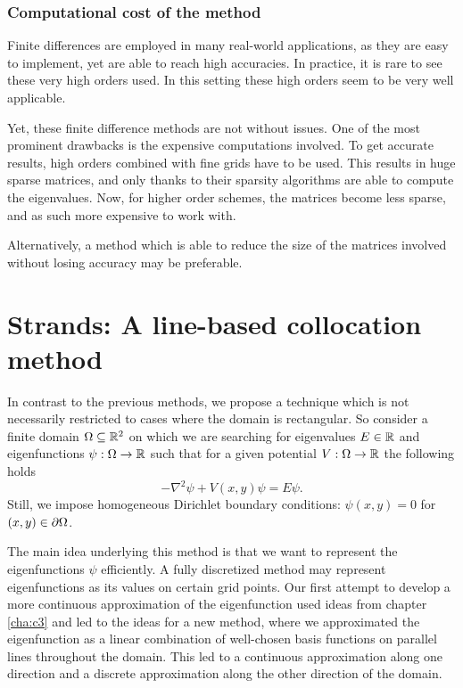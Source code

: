 

\subsubsection{Computational cost of the method}

Finite differences are employed in many real-world applications, as they are easy to implement, yet are able to reach high accuracies. In practice, it is rare to see these very high orders used. In this setting these high orders seem to be very well applicable.

Yet, these finite difference methods are not without issues. One of the most prominent drawbacks is the expensive computations involved. To get accurate results, high orders combined with fine grids have to be used. This results in huge sparse matrices, and only thanks to their sparsity algorithms are able to compute the eigenvalues. Now, for higher order schemes, the matrices become less sparse, and as such more expensive to work with.

Alternatively, a method which is able to reduce the size of the matrices involved without losing accuracy may be preferable.

\section{Strands: A line-based collocation method}\label{sec:c4_strands}

In contrast to the previous methods, we propose a technique which is not necessarily restricted to cases where the domain is rectangular. So consider a finite domain $\Omega \subseteq \mathbb{R}^2$ on which we are searching for eigenvalues $E \in \mathbb{R}$ and eigenfunctions $\psi: \Omega \to \mathbb{R}$ such that for a given potential $V : \Omega \to \mathbb{R}$ the following holds
\begin{equation}\label{equ:c4_schrodinger_equation_new_method}
    -\nabla^2 \psi + V(x, y) \psi = E \psi\text{.}
\end{equation}
Still, we impose homogeneous Dirichlet boundary conditions: $\psi(x, y) = 0$ for $(x, y) \in \partial\Omega$.

The main idea underlying this method is that we want to represent the eigenfunctions $\psi$ efficiently. A fully discretized method may represent eigenfunctions as its values on certain grid points. Our first attempt to develop a more continuous approximation of the eigenfunction used ideas from chapter \ref{cha:c3} and led to the ideas for a new method, where we approximated the eigenfunction as a linear combination of well-chosen basis functions on parallel lines throughout the domain. This led to a continuous approximation along one direction and a discrete approximation along the other direction of the domain.


